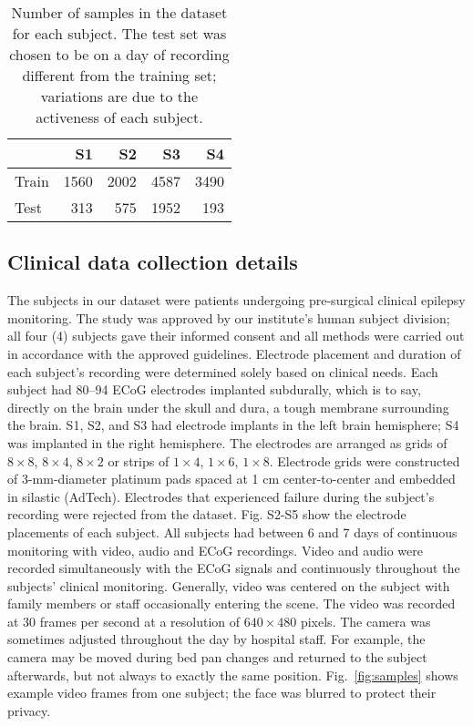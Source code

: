 \documentclass[letterpaper]{article} %
\begin{document}
\begin{table}[h]
\centering
\begin{tabular}{lrrrr}
\toprule
& S1   & S2   & S3   & S4   \\ 
\midrule
Train & 1560 & 2002 & 4587 & 3490 \\ 
Test  & 313  & 575  & 1952 & 193  \\ 
\bottomrule
\end{tabular}
\caption{Number of samples in the dataset for each subject. The test set was chosen to be on a day of recording different from the training set; variations are due to the activeness of each subject.}
\label{tab:trainingset}
\end{table}


\subsection{Clinical data collection details}

The subjects in our dataset were patients undergoing pre-surgical clinical epilepsy monitoring.
The study was approved by our institute's human subject division; all four (4) subjects gave their informed consent and all methods were carried out in accordance with the approved guidelines. 
Electrode placement and duration of each subject's recording were determined solely based on clinical needs. 
Each subject had 80--94 ECoG electrodes implanted subdurally, which is to say, directly on the brain under the skull and dura, a tough membrane surrounding the brain. 
S1, S2, and S3 had electrode implants in the left brain hemisphere; S4 was implanted in the right hemisphere. 
The electrodes are arranged as grids of $8\times8$, $8\times4$, $8\times2$ or strips of $1\times4$, $1\times6$, $1\times8$. 
Electrode grids were constructed of 3-mm-diameter platinum pads spaced at 1 cm center-to-center and embedded in silastic (AdTech). 
Electrodes that experienced failure during the subject's recording were rejected from the dataset.
Fig. S2-S5 show the electrode placements of each subject. 
All subjects had between 6 and 7 days of continuous monitoring with video, audio and ECoG recordings. 
Video and audio were recorded simultaneously with the ECoG signals and continuously throughout the subjects' clinical monitoring. 
Generally, video was centered on the subject with family members or staff occasionally entering the scene. 
The video was recorded at 30 frames per second at a resolution of $640\times480$ pixels. The camera was sometimes adjusted throughout the day by hospital staff. 
For example, the camera may be moved during bed pan changes and returned to the subject afterwards, but not always to exactly the same position. 
Fig.~\ref{fig:samples} shows example video frames from one subject; the face was blurred to protect their privacy. 
\end{document}
